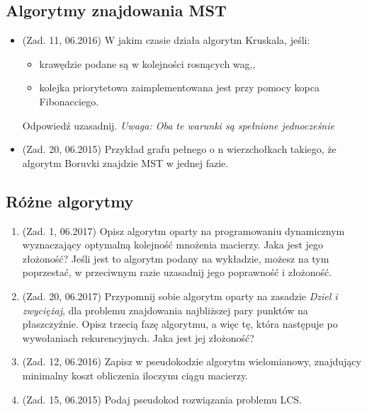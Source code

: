 \documentclass[10pt]{article}%
\begin{document}
\subsection*{Algorytmy znajdowania MST}
\begin{itemize}
\item (Zad. 11, 06.2016) W jakim czasie działa algorytm Kruskala, jeśli:
\begin{itemize}
\item krawędzie podane są w kolejności rosnących wag,,
\item kolejka priorytetowa zaimplementowana jest przy pomocy kopca Fibonacciego.
\end{itemize}
Odpowiedź uzasadnij. \textit{Uwaga: Oba te warunki są spełnione jednocześnie}

\item (Zad. 20, 06.2015) Przykład grafu pełnego o n wierzchołkach takiego, że algorytm Boruvki znajdzie MST w jednej fazie.
\end{itemize}
\subsection*{Różne algorytmy}
\begin{enumerate}
\item(Zad. 1, 06.2017)
Opisz algorytm oparty na programowaniu dynamicznym wyznaczający optymalną kolejność mnożenia macierzy. Jaka jest jego złożoność? Jeśli jest to algorytm podany na wykładzie, możesz na tym poprzestać, w przeciwnym razie uzasadnij jego poprawność i złożoność.

\item (Zad. 20, 06.2017) Przypomnij sobie algorytm oparty na zasadzie \emph{Dziel i zwyciężaj}, dla problemu znajdowania najbliższej pary punktów na płaszczyźnie. Opisz trzecią fazę algorytmu, a więc tę, która następuje po wywołaniach rekurencyjnych. Jaka jest jej złożoność?

\item (Zad. 12, 06.2016) Zapisz w pseudokodzie algorytm wielomianowy, znajdujący minimalny koszt obliczenia iloczynu ciągu macierzy.

\item (Zad. 15, 06.2015) Podaj pseudokod rozwiązania problemu LCS.
\end{enumerate}
\end{document}
